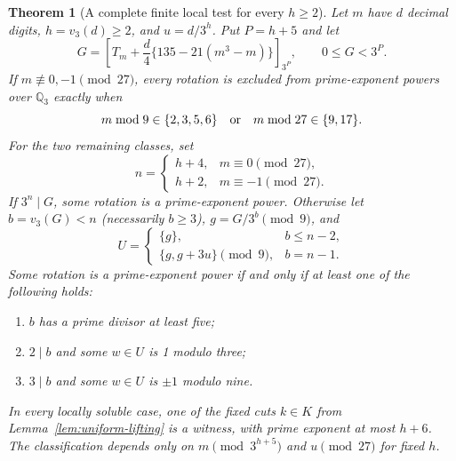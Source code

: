 \documentclass[10pt]{article}
\newtheorem{theorem}{Theorem}
\begin{document}
\begin{theorem}[A complete finite local test for every $h\ge2$]\label{thm:all-h-test}
Let $m$ have $d$ decimal digits, $h=v_3(d)\ge2$, and $u=d/3^h$.
Put $P=h+5$ and let
\[
 G=\left[T_m+\frac d4\{135-21(m^3-m)\}\right]_{3^P},
 \qquad 0\le G<3^P.
\]
If $m\not\equiv0,-1\pmod{27}$, every rotation is excluded from
prime-exponent powers over $\mathbb Q_3$ exactly when
\[
 m\bmod9\in\{2,3,5,6\}\quad\hbox{or}\quad
 m\bmod27\in\{9,17\}.
\]
For the two remaining classes, set
\[
 n=\begin{cases}h+4,&m\equiv0\pmod{27},\\
 h+2,&m\equiv-1\pmod{27}.
 \end{cases}
\]
If $3^n\mid G$, some rotation is a prime-exponent power.
Otherwise let $b=v_3(G)<n$ (necessarily $b\ge3$), $g=G/3^b\pmod9$, and
\[
 U=\begin{cases}\{g\},&b\le n-2,\\
 \{g,g+3u\}\pmod9,&b=n-1.
 \end{cases}
\]
Some rotation is a prime-exponent power if and only if at least one
of the following holds:
\begin{enumerate}
\item $b$ has a prime divisor at least five;
\item $2\mid b$ and some $w\in U$ is 1 modulo three;
\item $3\mid b$ and some $w\in U$ is $\pm1$ modulo nine.
\end{enumerate}
In every locally soluble case, one of the fixed cuts $k\in K$
from Lemma~\ref{lem:uniform-lifting} is a witness, with prime exponent
at most $h+6$. The classification depends only on
$m\pmod{3^{h+5}}$ and $u\pmod{27}$ for fixed $h$.
\end{theorem}
\end{document}
